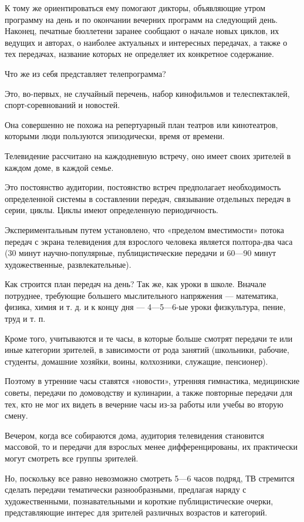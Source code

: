 \documentclass[12pt, a4paper, openany]{book}
\begin{document}
К тому же ориентироваться ему помогают дикторы, объявляющие утром программу на день и по окончании вечерних программ на следующий день. Наконец, печатные бюллетени заранее сообщают о начале новых циклов, их ведущих и авторах, о наиболее актуальных и интересных передачах, а также о тех передачах, название которых не определяет их конкретное содержание. 

Что же из себя представляет телепрограмма? 

Это, во-первых, не случайный перечень, набор кинофильмов и телеспектаклей, спорт-соревнований и новостей. 

Она совершенно не похожа на репертуарный план театров или кинотеатров, которыми люди пользуются эпизодически, время от времени. 

Телевидение рассчитано на каждодневную встречу, оно имеет своих зрителей в каждом доме, в каждой семье. 

Это постоянство аудитории, постоянство встреч предполагает необходимость определенной системы в составлении передач, связывание отдельных передач в серии, циклы. Циклы имеют определенную периодичность. 

Экспериментальным путем установлено, что «пределом вместимости» потока передач с экрана телевидения для взрослого человека является полтора-два часа (30 минут научно-популярные, публицистические передачи и 60—90 минут художественные, развлекательные). 

Как строится план передач на день? Так же, как уроки в школе. Вначале потруднее, требующие большего мыслительного напряжения — математика, физика, химия и т. д. и к концу дня — 4—5—6-ые уроки физкультура, пение, труд и т. п.

Кроме того, учитываются и те часы, в которые больше смотрят передачи те или иные категории зрителей, в зависимости от рода занятий (школьники, рабочие, студенты, домашние хозяйки, воины, колхозники, служащие, пенсионер). 

Поэтому в утренние часы ставятся «новости», утренняя гимнастика, медицинские советы, передачи по домоводству и кулинарии, а также повторные передачи для тех, кто не мог их видеть в вечерние часы из-за работы или учебы во вторую смену. 

Вечером, когда все собираются дома, аудитория телевидения становится массовой, то и передачи для взрослых менее дифференцированы, их практически могут смотреть все группы зрителей. 

Но, поскольку все равно невозможно смотреть 5—6 часов подряд, ТВ стремится сделать передачи тематически разнообразными, предлагая наряду с художественными, познавательными и короткие публицистические очерки, представляющие интерес для зрителей различных возрастов и категорий. 
\end{document}
